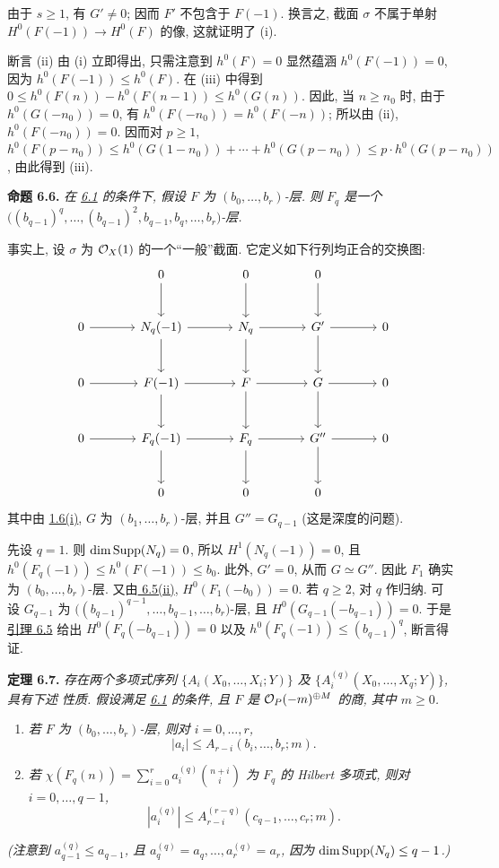 由于 $s\geq1$, 有 $G'\ne0$; 因而 $F'$ 不包含于 $F(-1)$. 换言之, 截面 $\sigma$ 不属于单射 $H^0(F(-1))\to H^0(F)$ 的像, 这就证明了 (i).

断言 (ii) 由 (i) 立即得出, 只需注意到
$h^0(F)=0$ 显然蕴涵 $h^0(F(-1))=0$, 因为
$h^0(F(-1))\leq h^0(F)$. 在 (iii) 中得到
$0\leq h^0(F(n))-h^0(F(n-1))\leq h^0(G(n))$.
因此, 当 $n\geq n_0$ 时, 由于 $h^0(G(-n_0))=0$, 有 $h^0(F(-n_0))=h^0(F(-n))$; 所以由 (ii), $h^0(F(-n_0))=0$. 因而对 $p\geq1$,
$h^0(F(p-n_0))
\leq h^0(G(1-n_0))+\cdots+h^0(G(p-n_0))
\leq p\cdot h^0(G(p-n_0))$,
由此得到 (iii).

\textbf{命题 6.6.} \emph{在 \hyperlink{sga6.e13.para.6-1}{6.1} 的条件下, 假设
$F$ 为 $(b_0,\ldots,b_r)$-层. 则 $F_q$ 是一个
$\bigl((b_{q-1})^q,\ldots,(b_{q-1})^2,b_{q-1},b_q,\ldots,b_r\bigr)$-层.}

事实上, 设 $\sigma$ 为 $\mathcal O_X(1)$ 的一个“一般”截面. 它定义如下行列均正合的交换图:
\[
\begin{tikzcd}[column sep=large,row sep=large]
&0 \arrow[d]&0 \arrow[d]&0 \arrow[d]&\\
0 \arrow[r]&N_q(-1) \arrow[r] \arrow[d]&N_q \arrow[r] \arrow[d]&G' \arrow[r] \arrow[d]&0\\
0 \arrow[r]&F(-1) \arrow[r] \arrow[d]&F \arrow[r] \arrow[d]&G \arrow[r] \arrow[d]&0\\
0 \arrow[r]&F_q(-1) \arrow[r] \arrow[d]&F_q \arrow[r] \arrow[d]&G'' \arrow[r] \arrow[d]&0\\
&0&0&0&
\end{tikzcd}
\]
其中由 \hyperlink{sga6.e13.prop.1-6}{1.6(i)}, $G$ 为 $(b_1,\ldots,b_r)$-层, 并且
$G''=G_{q-1}$ (这是深度的问题).

先设 $q=1$. 则 $\dim\operatorname{Supp}(N_q)=0$, 所以
$H^1(N_q(-1))=0$, 且 $h^0(F_q(-1))\leq h^0(F(-1))\leq b_0$.
此外, $G'=0$, 从而 $G\simeq G''$. 因此 $F_1$ 确实为 $(b_0,\ldots,b_r)$-层. 又由\hyperlink{sga6.e13.lem.6-5}{ 6.5(ii)},
$H^0(F_1(-b_0))=0$. 若 $q\geq2$, 对 $q$ 作归纳. 可
设 $G_{q-1}$ 为
$\bigl((b_{q-1})^{q-1},\ldots,b_{q-1},\ldots,b_r\bigr)$-层, 且
$H^0(G_{q-1}(-b_{q-1}))=0$. 于是\hyperlink{sga6.e13.lem.6-5}{引理 6.5} 给出
$H^0(F_q(-b_{q-1}))=0$ 以及 $h^0(F_q(-1))\leq(b_{q-1})^q$,
断言得证.

\textbf{定理 6.7.} \emph{存在两个多项式序列
$\{A_i(X_0,\allowbreak\ldots,X_i;Y)\}$ 及
$\{A_i^{(q)}(X_0,\allowbreak\ldots,X_q;Y)\}$, 具有下述
性质. 假设满足 \hyperlink{sga6.e13.para.6-1}{6.1} 的条件, 且 $F$ 是
$\mathcal O_P(-m)^{\oplus M}$ 的商, 其中 $m\geq0$.}
\begin{enumerate}[label=(\roman*)]
\item \emph{若 $F$ 为 $(b_0,\ldots,b_r)$-层, 则对
$i=0,\ldots,r$,}
\[
  |a_i|\leq A_{r-i}(b_i,\ldots,b_r;m).
\]
\item \emph{若
$\chi(F_q(n))=\sum_{i=0}^{r}a_i^{(q)}\binom{n+i}{i}$ 为 $F_q$ 的 Hilbert
多项式, 则对 $i=0,\ldots,q-1$,}
\[
  |a_i^{(q)}|\leq A_{r-i}^{(r-q)}(c_{q-1},\ldots,c_r;m).
\]
\end{enumerate}
\emph{(注意到 $a_{q-1}^{(q)}\leq a_{q-1}$, 且
$a_q^{(q)}=a_q,\ldots,a_r^{(q)}=a_r$, 因为
$\dim\operatorname{Supp}(N_q)\leq q-1$.)}

